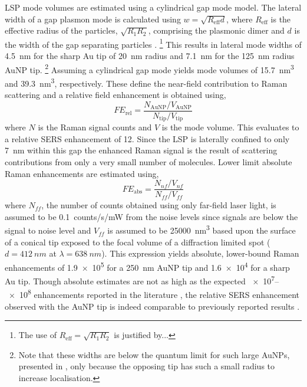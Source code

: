 \documentclass{article}
\begin{document}
LSP mode volumes are estimated using a cylindrical gap mode model. The lateral width of a gap plasmon mode is calculated using $w=\sqrt{R_{\mathrm{eff}}d}$, where $R_{\mathrm{eff}}$ is the effective radius of the particles, $\sqrt{R_1R_2}$, comprising the plasmonic dimer and $d$ is the width of the gap separating particles \cite{romero2006}.%
\footnote{\color{red}The use of $R_{\mathrm{eff}}=\sqrt{R_1 R_2}$ is justified by...}
This results in lateral mode widths of \SI{4.5}{nm} for the sharp Au tip of \SI{20}{nm} radius and \SI{7.1}{nm} for the \SI{125}{nm} radius AuNP tip.%
\footnote{Note that these widths are below the quantum limit for such large AuNPs, presented in \cite{savage2012}, only because the opposing tip has such a small radius to increase localisation.}
Assuming a cylindrical gap mode yields mode volumes of \SI{15.7}{nm\cubed} and \SI{39.3}{nm\cubed}, respectively. These define the near-field contribution to Raman scattering and a relative field enhancement is obtained using,
\begin{equation}
	\mathit{FE}_{\mathrm{rel}} = \frac{N_{\mathrm{AuNP}} / V_{\mathrm{AuNP}}}{N_{\mathrm{tip}} / V_{\mathrm{tip}}}
\end{equation}
where $N$ is the Raman signal counts and $V$ is the mode volume. This evaluates to a relative SERS enhancement of 12.
Since the LSP is laterally confined to only \SI{7}{nm} within this gap the enhanced Raman signal is the result of scattering contributions from only a very small number of molecules. Lower limit absolute Raman enhancements are estimated using,
\begin{equation}
	\mathit{FE}_{\mathrm{abs}} = \frac{N_{nf} / V_{nf}}{N_{ff} / V_{ff}}
\end{equation}
where $N_{ff}$, the number of counts obtained using only far-field laser light, is assumed to be \SI{0.1}{counts/s/mW} from the noise levels since signals are below the signal to noise level and $V_{ff}$ is assumed to be \SI{25000}{nm\cubed} based upon the surface of a conical tip exposed to the focal volume of a diffraction limited spot ($d = \SI{412}{nm}$ at $\lambda = \SI{638}{nm}$). %
This expression yields absolute, lower-bound Raman enhancements of \num{1.9e5} for a \SI{250}{nm} AuNP tip and \num{1.6e4} for a sharp Au tip. Though absolute estimates are not as high as the expected \num{e7}--\num{e8} enhancements reported in the literature \cite{pettinger2012}, the relative SERS enhancement observed with the AuNP tip is indeed comparable to previously reported results \cite{umakoshi2012}.
\end{document}
